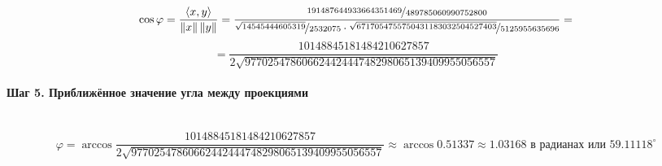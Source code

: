 \documentclass{article}
\begin{document}
$$\cos\varphi = \frac{\left\langle x, y\right\rangle }{\left\lVert x\right\rVert \left\lVert y\right\rVert} = \frac{\nicefrac{191487644933664351469}{489785060990752800}}{\nicefrac{\sqrt{14545444605319}}{2532075}\cdot\nicefrac{\sqrt{6717054755750431183032504527403}}{5125955635696}} =$$
$$= \frac{10148845181484210627857}{2\sqrt{97702547860662442444748298065139409955056557}}$$
\paragraph*{Шаг 5. Приближённое значение угла между проекциями} \, \\
$$\varphi = \arccos\frac{10148845181484210627857}{2\sqrt{97702547860662442444748298065139409955056557}} \approx \arccos 0.51337 \approx 1.03168 \text{ в радианах или } 59.11118^{\circ}$$
\end{document}

